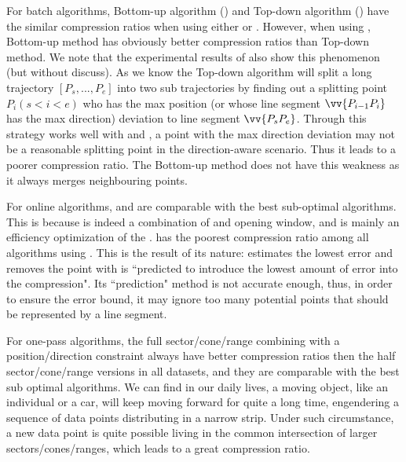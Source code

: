 For batch algorithms, Bottom-up algorithm (\tpa) and Top-down algorithm (\dpa) have the similar compression ratios when using either \ped or \sed. However, when using \dad, Bottom-up method has obviously better compression ratios than Top-down method. We note that the experimental results of \cite{Long:Direction} also show this phenomenon (but without discuss). As we know the Top-down algorithm will split a long trajectory $[P_s, ..., P_e]$ into two sub trajectories by finding out a splitting point $P_i (s<i<e)$ who has the max position (or whose line segment $\vv{P_{i-1}P_{i}}$ has the max direction) deviation to line segment $\vv{P_sP_{e}}$. Through this strategy works well with \ped and \sed, a point with the max direction deviation may not be a reasonable splitting point in the direction-aware scenario. Thus it leads to a poorer compression ratio. The Bottom-up method does not have this weakness as it always merges neighbouring points.



For online algorithms, \bqsa and \opwa are comparable with the best sub-optimal algorithms. This is because \opwa is indeed a combination of \dpa and opening window, and \bqsa is mainly an efficiency optimization of the \opwa.
\squishe has the poorest compression ratio among all algorithms using \sed. This is the result of its nature: \squishe estimates the lowest \sed error and removes the point with is ``predicted to introduce the lowest amount of error into the compression"\cite{Muckell:SQUISH}. Its ``prediction" method is not accurate enough, thus, in order to ensure the error bound, it may ignore too many potential points that should be represented by a line segment.

For one-pass algorithms, the full sector/cone/range combining with a position/direction constraint always have better compression ratios then the half sector/cone/range versions in all datasets, and they are comparable with the best sub optimal algorithms.
We can find in our daily lives, a moving object, like an individual or a car, will keep moving forward for quite a long time, engendering a sequence of data points distributing in a narrow strip. Under such circumstance, a new data point is quite possible living in the common intersection of larger sectors/cones/ranges, which leads to a great compression ratio.



